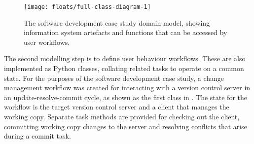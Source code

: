 \documentclass{llncs}
\begin{document}
\begin{figure}[t]
  \centering
  \texttt{[image: floats/full-class-diagram-1]}
  \caption{The software development case study domain model, showing information system artefacts and functions that can
    be accessed by user workflows.}
  \label{fig:domain}

\end{figure}


The second modelling step is to define user behaviour workflows. These are also implemented as Python classes, collating
related tasks to operate on a common state. For the purposes of the software development case study, a change management
workflow was created for interacting with a version control server in an update-resolve-commit cycle, as shown as the
first class in .  The state for the workflow is the target version control server and a client
that manages the working copy.  Separate task methods are provided for checking out the client, committing working copy
changes to the server and resolving conflicts that arise during a commit task.
\end{document}
